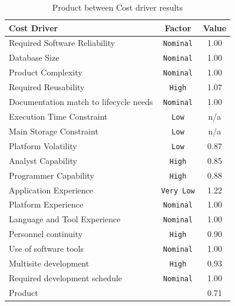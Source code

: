 \begin{table}[h!]
    \centering
\begin{tabular}{| p{8cm} | c | c |} \hline
Cost Driver                               & Factor             &  Value   \\ \hline 
Required Software Reliability             & \texttt{Nominal}   &  1.00    \\
Database Size                             & \texttt{Nominal}   &  1.00    \\
Product Complexity                        & \texttt{Nominal}   &  1.00    \\
Required Reusability                      & \texttt{High}      &  1.07    \\
Documentation match to life\-cycle needs  & \texttt{Nominal}   &  1.00    \\
Execution Time Constraint                 & \texttt{Low}       &   n/a    \\
Main Storage Constraint                   & \texttt{Low}       &   n/a    \\
Platform Volatility                       & \texttt{Low}       &  0.87    \\
Analyst Capability                        & \texttt{High}      &  0.85    \\  
Programmer Capability                     & \texttt{High}      &  0.88    \\  
Application Experience                    & \texttt{Very Low}  &  1.22    \\  
Platform Experience                       & \texttt{Nominal}   &  1.00    \\  
Language and Tool Experience              & \texttt{Nominal}   &  1.00    \\  
Personnel continuity                      & \texttt{High}      &  0.90    \\  
Use of software tools                     & \texttt{Nominal}   &  1.00    \\  
Multisite development                     & \texttt{High}      &  0.93    \\   
Required development schedule             & \texttt{Nominal}   &  1.00    \\ \hline
Product                                   &                    &  0.71    \\ \hline
\end{tabular}
\caption{Product between Cost driver results}
\label{tab:cocomo2}
\end{table}

